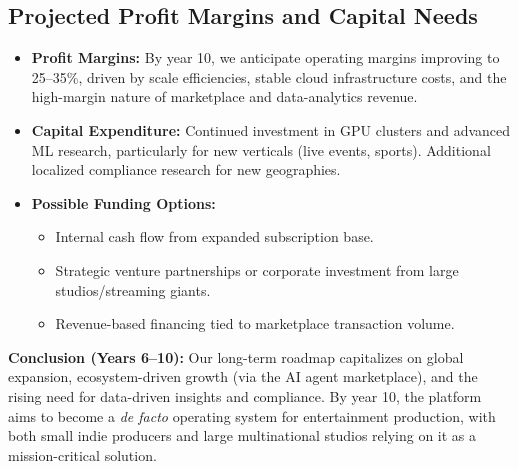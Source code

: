 \documentclass[11pt]{article}
\begin{document}
\subsection{Projected Profit Margins and Capital Needs}
\begin{itemize}
    \item \textbf{Profit Margins:} By year 10, we anticipate operating margins improving to 25--35\%, driven by scale efficiencies, stable cloud infrastructure costs, and the high-margin nature of marketplace and data-analytics revenue.
    \item \textbf{Capital Expenditure:} Continued investment in GPU clusters and advanced ML research, particularly for new verticals (live events, sports). Additional localized compliance research for new geographies.
    \item \textbf{Possible Funding Options:}
    \begin{itemize}
        \item Internal cash flow from expanded subscription base.
        \item Strategic venture partnerships or corporate investment from large studios/streaming giants.
        \item Revenue-based financing tied to marketplace transaction volume.
    \end{itemize}
\end{itemize}

\noindent \textbf{Conclusion (Years 6--10):}
Our long-term roadmap capitalizes on global expansion, ecosystem-driven growth (via the AI agent marketplace), and the rising need for data-driven insights and compliance. By year 10, the platform aims to become a \emph{de facto} operating system for entertainment production, with both small indie producers and large multinational studios relying on it as a mission-critical solution.
\end{document}
